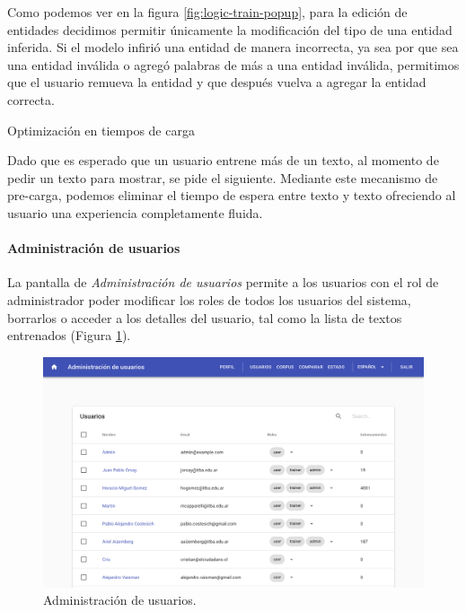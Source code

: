 \documentclass[12pt,a4paper,]{scrartcl}
\let\oldparagraph\paragraph
\renewcommand{\paragraph}[1]{\oldparagraph{#1}\mbox{}}
\begin{document}
Como podemos ver en la figura \ref{fig:logic-train-popup}, para la edición de entidades decidimos permitir únicamente la modificación del tipo de una entidad inferida.
Si el modelo infirió una entidad de manera incorrecta, ya sea por que sea una entidad inválida o agregó palabras de más a una entidad inválida, permitimos que el usuario remueva la entidad y que después vuelva a agregar la entidad correcta.

Optimización en tiempos de carga

Dado que es esperado que un usuario entrene más de un texto, al momento de pedir un texto para mostrar, se pide el siguiente. Mediante este mecanismo de pre-carga, podemos eliminar el tiempo de espera entre texto y texto ofreciendo al usuario una experiencia completamente fluida.

\hypertarget{administraciuxf3n-de-usuarios}{%
\paragraph{Administración de usuarios}\label{administraciuxf3n-de-usuarios}}

La pantalla de \emph{Administración de usuarios} permite a los usuarios con el rol de administrador poder modificar los roles de todos los usuarios del sistema, borrarlos o acceder a los detalles del usuario, tal como la lista de textos entrenados (Figura \ref{fig:logic-user-list}).

\begin{figure}[H]

{\centering \includegraphics{assets/logic/user-list.pdf} 

}

\caption{Administración de usuarios.}\label{fig:logic-user-list}
\end{figure}
\end{document}
